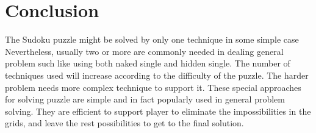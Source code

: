 \documentclass[11pt]{report}
\begin{document}
\chapter{Conclusion}
\label{sec:Conclusion}
The Sudoku puzzle might be solved by only one technique in some simple case Nevertheless, usually two or more are commonly needed in dealing general problem such like using both naked single and hidden single. The number of techniques used will increase according to the difficulty of the puzzle. The harder problem needs more complex technique to support it.
These special approaches for solving puzzle are simple and in fact popularly used in general problem solving. They are efficient to support player to eliminate the impossibilities in the grids, and leave the rest possibilities to get to the final solution.





\end{document}
